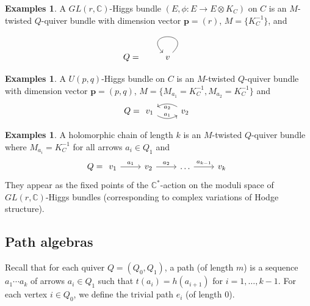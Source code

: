 \documentclass[11pt]{amsart}
\theoremstyle{plain}
\theoremstyle{definition}
\newtheorem{exmp}[theorem]{Examples}
\theoremstyle{remark}
\def\C{\mathbb{C}}
\begin{document}
\begin{exmp}
A $GL(r,\C)$-Higgs bundle $(E, \phi: E\to E\otimes K_C )$ on $C$ is an $M$-twisted $Q$-quiver bundle with dimension vector $\bm{p}=(r)$, $M= \{K_C^{-1}\}$, and
\begin{equation*}
    Q =\begin{tikzcd}
        v\arrow[loop]
    \end{tikzcd}
\end{equation*}    
\end{exmp}

\begin{exmp}
A $U(p,q)$-Higgs bundle on $C$ is an $M$-twisted $Q$-quiver bundle with dimension vector $\bm{p}=(p,q)$, $M=\{M_{a_1}=K_C^{-1},M_{a_2}=K_C^{-1}\}$ and
\begin{equation*}
    Q= \begin{tikzcd}
        v_1\arrow[r,bend right
        ,"a_1"]&v_2\arrow[l,bend right,"a_2"]
    \end{tikzcd}
\end{equation*}
\end{exmp}
\begin{exmp}
    A holomorphic chain of length $k$ is an $M$-twisted $Q$-quiver bundle where $M_{a_i}=K_C^{-1}$ for all arrows $a_i\in Q_1$ and
    \begin{equation*}
        Q = \begin{tikzcd}
        v_1\arrow[r,"a_1"] &v_2 \arrow[r,"a_2"]&\dots \arrow[r,"a_{k-1}"]&v_k
        \end{tikzcd}
    \end{equation*}
    They appear as the fixed points of the $\C^*$-action on the moduli space of $GL(r,\C)$-Higgs bundles (corresponding to complex variations of Hodge structure). 
\end{exmp}
                
            
            \subsection{Path algebras}
Recall that for each quiver $Q=(Q_0,Q_1)$, a path (of length $m$) is a sequence $a_1\cdots a_k$ of arrows $a_i\in Q_1$ such that $t(a_{i})= h(a_{i+1})$ for $i=1,\dots , k-1$. For each vertex $i\in Q_0$, we define the trivial path $e_i$ (of length 0). %
\end{document}
